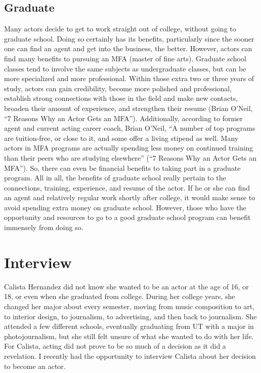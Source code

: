 \begin{multicols}{2}
	\subsection{Graduate}
		Many actors decide to get to work straight out of college, without going to graduate school. Doing so certainly has its benefits, particularly since the sooner one can find an agent and get into the business, the better. However, actors can find many benefits to pursuing an MFA (master of fine arts). Graduate school classes tend to involve the same subjects as undergraduate classes, but can be more specialized and more professional. Within those extra two or three years of study, actors can gain credibility, become more polished and professional, establish strong connections with those in the field and make new contacts, broaden their amount of experience, and strengthen their resume (Brian O’Neil, “7 Reasons Why an Actor Gets an MFA”). Additionally, according to former agent and current acting career coach, Brian O’Neil, “A number of top programs are tuition-free, or close to it, and some offer a living stipend as well. Many actors in MFA programs are actually spending less money on continued training than their peers who are studying elsewhere” (“7 Reasons Why an Actor Gets an MFA”). So, there can even be financial benefits to taking part in a graduate program. All in all, the benefits of graduate school really pertain to the connections, training, experience, and resume of the actor. If he or she can find an agent and relatively regular work shortly after college, it would make sense to avoid spending extra money on graduate school. However, those who have the opportunity and resources to go to a good graduate school program can benefit immensely from doing so. 

\section{Interview}
	Calista Hernandez did not know she wanted to be an actor at the age of 16, or 18, or even when she graduated from college. During her college years, she changed her major about every semester, moving from music composition to art, to interior design, to journalism, to advertising, and then back to journalism. She attended a few different schools, eventually graduating from UT with a major in photojournalism, but she still felt unsure of what she wanted to do with her life. For Calista, acting did not prove to be so much of a decision as it did a revelation. I recently had the opportunity to interview Calista about her decision to become an actor. 


\end{multicols}
